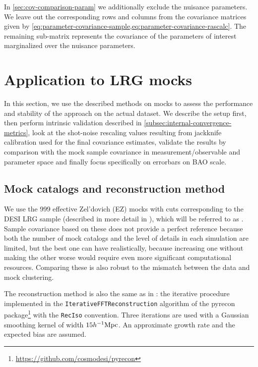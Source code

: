 In \cref{sec:cov-comparison-param} we additionally exclude the nuisance parameters.
We leave out the corresponding rows and columns from the covariance matrices given by \cref{eq:parameter-covariance-sample,eq:parameter-covariance-rascalc}.
The remaining sub-matrix represents the covariance of the parameters of interest marginalized over the nuisance parameters.

\section{Application to \desimtwo{} LRG mocks}
\label{sec:validation-DESI-M2}

In this section, we use the described methods on \desimtwo{} mocks to assess the performance and stability of the approach on the actual dataset.
We describe the setup first, then perform intrinsic validation described in \cref{subsec:internal-convergence-metrics}, look at the shot-noise rescaling values resulting from jackknife calibration used for the final covariance estimates, validate the \rascalc{} results by comparison with the mock sample covariance in measurement/observable and parameter space and finally focus specifically on errorbars on BAO scale.

\subsection{Mock catalogs and reconstruction method}
\label{subsec:mocks}

We use the 999 effective Zel'dovich (EZ) mocks \citep{EZmocks,EZmocks2021} with cuts corresponding to the DESI LRG sample \citep{LRG.TS.Zhou.2023} (described in more detail in \cite{BAO.EDR.Moon.2023}), which will be referred to as \themocks{}.
Sample covariance based on these does not provide a perfect reference because both the number of mock catalogs and the level of details in each simulation are limited, but the best one can have realistically, because increasing one without making the other worse would require even more significant computational resources.
Comparing these is also robust to the mismatch between the data and mock clustering.

The reconstruction method is also the same as in \cite{BAO.EDR.Moon.2023}: the iterative procedure \citep{recon-fourier-space} implemented in the {\tt IterativeFFTReconstruction} 
algorithm of the {\sc pyrecon} package\footnote{\url{https://github.com/cosmodesi/pyrecon}} with the {\tt RecIso} convention.
Three iterations are used with a Gaussian smoothing kernel of width $15 h^{-1}{\rm Mpc}$. 
An approximate growth rate and the expected bias are assumed.

